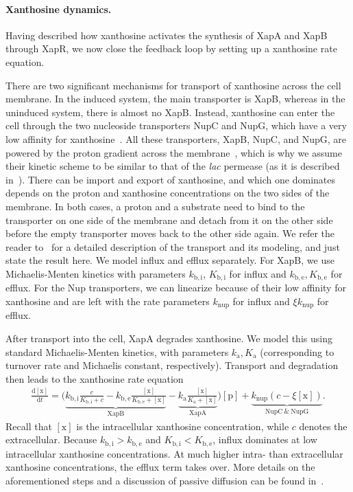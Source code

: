 \documentclass[10pt,letterpaper]{article}
\newcommand{\n}[1]{\mathrm{#1}}
\newcommand{\dd}[2]{\frac{\mathrm{d} #1}{\mathrm{d} #2}}
\begin{document}
	\paragraph*{Xanthosine dynamics.}
	Having described how xanthosine activates the synthesis of XapA and
	XapB through XapR, we now close the feedback loop
	by setting up a xanthosine rate equation.
	
	There are two significant mechanisms for transport of xanthosine across
	the cell membrane. In the induced system, the main transporter is XapB,
	whereas in the uninduced system, there is almost no XapB. Instead,
	xanthosine can enter the cell through the two nucleoside transporters
	NupC and NupG, which have a very low affinity for
	xanthosine~\cite{Norholm2001}. All these transporters, XapB, NupC, and
	NupG, are powered by the proton gradient across the
	membrane~\cite{Norholm2001}, which is why we assume their kinetic scheme
	to be similar to that of the \emph{lac} permease (as it is described
	in~\cite{Kaback2015}). There can be import and export of xanthosine, and
	which one dominates depends on the proton and xanthosine concentrations
	on the two sides of the membrane. In both cases, a proton and a
	substrate need to bind to the transporter on one side of the membrane
	and detach from it on the other side before the empty transporter moves
	back to the other side again. We refer the reader to~
	for a detailed description of the transport and its modeling, and just
	state the result here. We model influx and efflux separately. For XapB,
	we use Michaelis-Menten kinetics with parameters $k_{\n{b, i}}$,
	$K_{\n{b, i}}$ for influx and $k_{\n{b, e}}, K_{\n{b,e}}$ for efflux.
	For the Nup transporters, we can linearize because of their low affinity
	for xanthosine and are left with the rate parameters $k_{\n{nup}}$ for
	influx and $\xi k_{\n{nup}}$ for efflux.
		
	After transport into the cell, XapA degrades xanthosine. We model this using
	standard Michaelis-Menten kinetics, with parameters $k_{\n{a}}, K_{\n{a}}$
	(corresponding to turnover rate and Michaelis constant, respectively). Transport and degradation then leads to the xanthosine rate equation
	\begin{eqnarray}
	\dd{\n{[x]}}{t} = \biggl(\underbrace{k_{\n{b,i}} \frac{c}{K_{\n{b,i}} + c} - k_{\n{b,e}} \frac{\n{[x]}}{K_{\n{b,e}} + \n{[x]}}}_{\n{XapB}} - \underbrace{k_{\n{a}} \frac{\n{[x]}}{K_{\n{a}} + \n{[x]}}}_{\n{XapA}}\biggr) \n{[p]} + \underbrace{k_{\n{nup}} \left(c- \xi \n{[x]}\right)}_{\n{NupC\ \& \ NupG}}.
	\end{eqnarray}
	Recall that $\n{[x]}$ is the intracellular xanthosine concentration, while
	$c$ denotes the extracellular. Because $k_{\n{b,i}} > k_{\n{b,e}}$ and
	$K_{\n{b,i}} < K_{\n{b,e}}$, influx dominates at low intracellular
	xanthosine concentrations. At much higher intra- than extracellular
	xanthosine concentrations, the efflux term takes over. More details on the
	aforementioned steps and a discussion of passive diffusion can be found
	in~.
	
\end{document}
